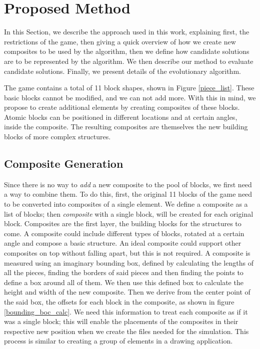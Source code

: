 \documentclass[conference]{IEEEtran}
\begin{document}
    \section{Proposed Method}
    \label{prop_method}  

In this Section, we describe the approach used in this work, explaining
first, the restrictions of the game, then giving a quick overview of how we
create new composites to be used by the algorithm, then we define how candidate
solutions are to be represented by the algorithm. We then describe our method to
evaluate candidate solutions. Finally, we present details of the evolutionary
algorithm. 

The game contains a total of 11 block shapes, shown in Figure
\ref{piece_list}. These basic blocks cannot be modified, and we can not add
more. With this in mind, we propose to create additional elements by creating
composites of these blocks. Atomic blocks can be positioned in different
locations and at certain angles, inside the composite. The resulting composites
are themselves the new building blocks of more complex structures. 
    
\subsection{Composite Generation}

Since there is no way to \textit{add} a new composite to the pool of blocks, we
first need a way to combine them. To do this, first, the original 11 blocks of
the game need to be converted into composites of a single element.  We define a
composite as a list of blocks; then  \textit{composite} with a single block,
will be created for each original block. Composites are the first layer, the
building blocks for the structures to come. A composite could include different
types of blocks, rotated at a certain angle and compose a basic structure. An
ideal composite could support other composites on top without falling apart, but
this is not required. A composite is measured using an imaginary bounding box,
defined by calculating the lengths of all the pieces, finding the borders of
said pieces and then finding the points to define a box around all of them. We
then use this defined box to calculate the height and width of the new
composite. Then we derive from the center point of the said box, the offsets for
each block in the composite, as shown in figure \ref{bounding_boc_calc}. We need
this information to treat each composite as if it was a single block; this will
enable the placements of the composites in their respective new position when we
create the files needed for the simulation. This process is similar to creating
a group of elements in a drawing application.
\end{document}
